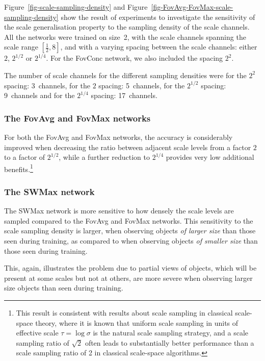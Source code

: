 \documentclass[twocolumn,runningheads]{svjour3}
\begin{document}
Figure~\ref{fig-scale-sampling-density} and
Figure~\ref{fig-FovAvg-FovMax-scale-sampling-density} show the result of 
experiments to investigate the sensitivity of the scale generalisation
property to the sampling density of the scale channels.
All the networks were trained on size~2, with the scale channels spanning
the scale range $[\frac{1}{2}, 8]$, and with a varying spacing between the
scale channels: either $2$, $2^{1/2}$ or $2^{1/4}$.
For the FovConc network, we also included the spacing $2^2$.

The number of scale channels for the different sampling densities were
for the $2^2$ spacing: 3~channels, for the $2$ spacing:  5~channels,
for the $2^{1/2}$ spacing: 9~channels and for the $2^{1/4}$ spacing:
17~channels.

\subsubsection{The FovAvg and FovMax networks}

For both the FovAvg and FovMax networks, the accuracy is
considerably improved when decreasing the ratio between adjacent
scale levels from a factor $2$ to a factor of $2^{1/2}$,
while a further reduction to $2^{1/4}$ 
provides very low additional benefits.\footnote{This result is consistent with results about scale sampling
  in classical scale-space theory, where it is known that uniform
  scale sampling in units of effective scale $\tau = \log \sigma$
  \cite{Lin92-PAMI} is the
  natural scale sampling strategy, and a scale sampling ratio of
  $\sqrt{2}$ often leads to substantially better performance than a scale
  sampling ratio of 2 in classical scale-space algorithms.}


\subsubsection{The SWMax network}

The SWMax network is more sensitive to how densely the scale levels are
sampled compared to the FovAvg and FovMax networks. This
sensitivity to the scale sampling density is larger, when observing
objects {\em of larger size\/} than those seen during training, as
compared to when observing objects {\em of smaller size\/} than
those seen during training.

This, again, illustrates the problem due to
partial views of objects, which will be present at some scales but not
at others, are more severe when observing larger size objects than
seen during training.
\end{document}
